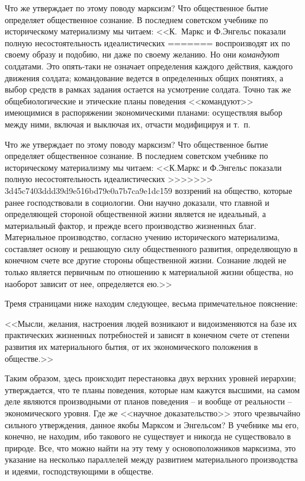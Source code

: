 \documentclass{book}
\begin{document}
Что же утверждает по этому поводу марксизм? Что обще­ственное бытие определяет общественное сознание. В послед­нем советском 
учебнике по историческому материализму мы читаем: <<К.~Маркс и Ф.Энгельс показали полную несостоятельность идеалистических 
=======
воспроизводят их по своему образу и подобию, ни даже по своему желанию. Но они \textit{командуют} солдатами. Это опять-таки не 
означает определения каждого действия, каждого движения солдата; командование ведется в определенных об­щих понятиях, а выбор 
средств в рамках задания остается на ус­мотрение солдата. Точно так же общебиологические и этические планы поведения <<командуют>> имеющимися в распоряжении экономическими планами: осуществляя выбор между ними, включая и выключая их, отчасти модифицируя и т.~п.

Что же утверждает по этому поводу марксизм? Что обще­ственное бытие определяет общественное сознание. В послед­нем советском 
учебнике по историческому материализму мы читаем: <<К.Маркс и Ф.Энгельс показали полную несостоятельность идеалистических 
>>>>>>> 3d45c7403ddd39d9e516bd79e0a7b7ca9e1dc159
воззрений на общество, которые ранее господ­ствовали в социологии. Они научно доказали, что главной и определяющей стороной 
общественной жизни является не иде­альный, а материальный фактор, и прежде всего производство жизненных благ. Материальное 
производство, согласно учению исторического материализма, составляет основу и решающую силу общественного развития, определяющую 
в конечном счете все другие стороны общественной жизни. Сознание людей не только является первичным по отношению к материальной 
жи­зни общества, но наоборот зависит от нее, определяется ею.>>

Тремя страницами ниже находим следующее, весьма приме­чательное пояснение:

<<Мысли, желания, настроения людей возникают и видоизме­няются на базе их практических жизненных потребностей и зависят в конечном 
счете от степени развития их материального бытия, от их экономического положения в обществе.>>

Таким образом, здесь происходит перестановка двух верхних уровней иерархии; утверждается, что те планы поведения, которые нам 
кажутся высшими, на самом деле являются производными от планов поведения -- и вообще от реальности -- экономи­ческого уровня. Где 
же <<научное доказательство>> этого чрезвычайно сильного утверждения, данное якобы Марксом и Энгельсом? В учебнике мы его, 
конечно, не находим, ибо такового не существует и никогда не существовало в природе. Все, что можно найти на эту тему у 
основоположников марксизма, это указание на несколько параллелей между развитием материального производства и идеями, 
господствующими в обществе.
\end{document}

